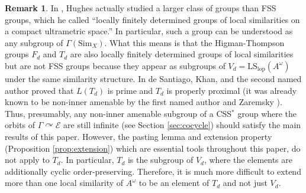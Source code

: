 \documentclass[12pt]{amsart}
\numberwithin{equation}{subsection}
\theoremstyle{definition}
\theoremstyle{definition}
\newtheorem{remark}[theorem]{Remark}
\theoremstyle{remark}
\begin{document}
\begin{remark}\label{rem:lfdg}
    In \cite{hughes2009}, Hughes actually studied a larger class of groups than FSS groups, which he called ``locally finitely determined groups of local similarities on a compact ultrametric space.'' In particular, such a group can be understood as any subgroup of $\Gamma(\text{Sim}_X)$. What this means is that the Higman-Thompson groups $F_d$ and $T_d$ are also locally finitely determined groups of local similarities but are not FSS groups because they appear as subgroups of $V_d = \text{LS}_{\text{lop}}(A^\omega)$ under the same similarity structure. In \cite{de2023mcduff} de Santiago, Khan, and the second named author proved that $L(T_d)$ is prime and $T_d$ is properly proximal (it was already known to be non-inner amenable by the first named author and Zaremsky \cite{bashwinger2022non}). Thus, presumably, any non-inner amenable subgroup of a CSS$^*$ group where the orbits of $\Gamma \curvearrowright \mathcal E$ are still infinite (see Section \ref{sec:cocycle}) should satisfy the main results of this paper. However, the pasting lemma and extension property (Proposition \ref{prop:extension}) which are essential tools throughout this paper, do not apply to $T_d$. In particular, $T_d$ is the subgroup of $V_d$, where the elements are additionally cyclic order-preserving. Therefore, it is much more difficult to extend more than one local similarity of $A^\omega$ to be an element of $T_d$ and not just $V_d$.
\end{remark}
\end{document}
